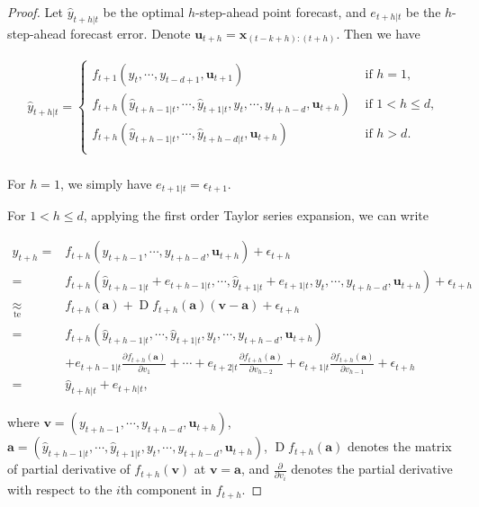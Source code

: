 \documentclass[
  11pt,
  a4paper,
]{article}
\theoremstyle{plain}
\theoremstyle{remark}
\begin{document}
\begin{proof}
Let \(\hat{y}_{t+h|t}\) be the optimal \(h\)-step-ahead point forecast,
and \(e_{t+h|t}\) be the \(h\)-step-ahead forecast error. Denote
\(\bm{u}_{t+h}=\bm{x}_{(t-k+h):(t+h)}\). Then we have

\[
\begin{aligned}
\hat{y}_{t+h|t}=\begin{cases}
      f_{t+1}\left(y_t,\cdots,y_{t-d+1},\bm{u}_{t+1}\right) & \text{ if } h=1, \\
      f_{t+h}\left(\hat{y}_{t+h-1|t},\cdots,\hat{y}_{t+1|t},y_t,\cdots,y_{t+h-d},\bm{u}_{t+h}\right) &  \text{ if } 1 < h \leq d, \\
      f_{t+h}\left(\hat{y}_{t+h-1|t},\cdots,\hat{y}_{t+h-d|t},\bm{u}_{t+h}\right) & \text{ if } h > d.\\
    \end{cases}\\
\end{aligned}
\]

For \(h=1\), we simply have \(e_{t+1|t} = \epsilon_{t+1}\).

For \(1<h\leq d\), applying the first order Taylor series expansion, we
can write

\[
\begin{aligned}
y_{t+h}
=&f_{t+h}\left(y_{t+h-1},\cdots,y_{t+h-d},\bm{u}_{t+h}\right)+\epsilon_{t+h} \\
=&f_{t+h}\left(\hat{y}_{t+h-1|t}+e_{t+h-1|t},\cdots,\hat{y}_{t+1|t}+e_{t+1|t},y_{t},\cdots,y_{t+h-d},\bm{u}_{t+h}\right)+\epsilon_{t+h} \\
\underset{\text{te}}{\approx}&f_{t+h}\left(\bm{a}\right)+\operatorname{D}f_{t+h}\left(\bm{a}\right)\left(\bm{v}-\bm{a}\right)+
\epsilon_{t+h} \\
=&f_{t+h}\left(\hat{y}_{t+h-1|t},\cdots,\hat{y}_{t+1|t},y_{t},\cdots,y_{t+h-d},\bm{u}_{t+h}\right) \\
&+e_{t+h-1|t}\frac{\partial f_{t+h}\left(\bm{a}\right)}{\partial v_1}+\cdots+e_{t+2|t}\frac{\partial f_{t+h}\left(\bm{a}\right)}{\partial v_{h-2}}+e_{t+1|t}\frac{\partial f_{t+h}\left(\bm{a}\right)}{\partial v_{h-1}}+\epsilon_{t+h} \\
=&\hat{y}_{t+h|t}+e_{t+h|t},
\end{aligned}
\]

where \(\bm{v}=\left(y_{t+h-1},\cdots,y_{t+h-d},\bm{u}_{t+h}\right)\),
\(\bm{a} =\left(\hat{y}_{t+h-1|t},\cdots,\hat{y}_{t+1|t},y_{t},\cdots,y_{t+h-d},\bm{u}_{t+h}\right)\),
\(\operatorname{D}f_{t+h}\left(\bm{a}\right)\) denotes the matrix of
partial derivative of \(f_{t+h}(\bm{v})\) at \(\bm{v}=\bm{a}\), and
\(\frac{\partial}{\partial v_i}\) denotes the partial derivative with
respect to the \(i\)th component in \(f_{t+h}\).


\end{proof}
\end{document}
